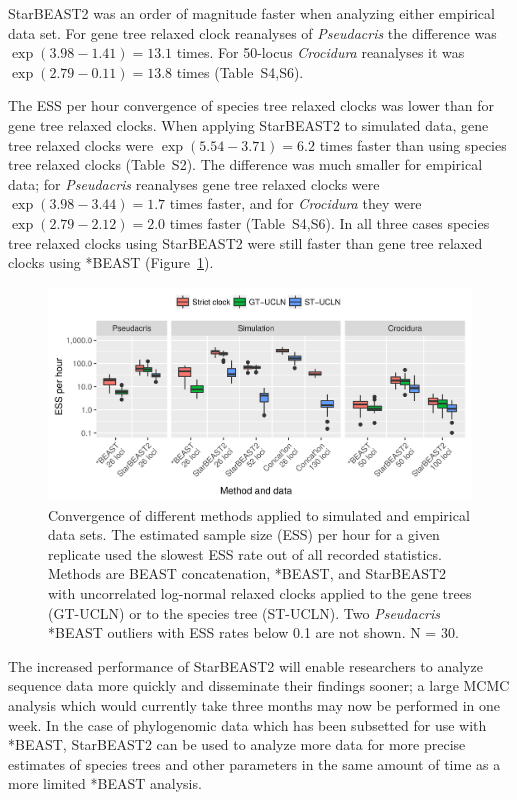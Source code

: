 \documentclass[12pt]{article}
\begin{document}
StarBEAST2 was an order of magnitude faster when analyzing either
empirical data set. For gene tree relaxed clock reanalyses of
\textit{Pseudacris} the difference was $\exp(3.98 - 1.41) = 13.1$ times. For
50-locus \textit{Crocidura} reanalyses it was $\exp(2.79 - 0.11) = 13.8$ times
(Table~S4,S6).

The ESS per hour convergence of species tree relaxed clocks was lower than for
gene tree relaxed clocks. When applying StarBEAST2 to simulated data, gene tree relaxed clocks were
$\exp(5.54 - 3.71) = 6.2$ times faster than using species tree relaxed clocks (Table~S2). The difference was much smaller for empirical data;
for \textit{Pseudacris} reanalyses gene tree relaxed clocks were $\exp(3.98 -
3.44) = 1.7$ times faster, and for \textit{Crocidura} they were $\exp(2.79 -
2.12) = 2.0$ times faster (Table~S4,S6). In all three cases species tree relaxed clocks
using StarBEAST2 were still faster than gene tree relaxed clocks using *BEAST
(Figure~\ref{fig:essPerHourComparison}).

\begin{figure}[htb!]
\centering
\includegraphics[width=\textwidth]{minimum_ess_per_hour_comparison.png}
\caption
{Convergence of different methods applied to simulated and empirical data
sets. The estimated sample size (ESS) per hour for a given replicate used the
slowest ESS rate out of all recorded statistics. Methods are BEAST
concatenation, *BEAST, and StarBEAST2 with uncorrelated log-normal relaxed
clocks applied to the gene trees (GT-UCLN) or to the species tree (ST-UCLN).
Two \textit{Pseudacris} *BEAST outliers with ESS rates below 0.1
are not shown.  N = 30.}
\label{fig:essPerHourComparison}
\end{figure}

The increased performance of StarBEAST2 will enable researchers to analyze
sequence data more quickly and disseminate their findings sooner; a large MCMC
analysis which would currently take three months may now be performed in one
week. In the case of phylogenomic data which has been subsetted for use with
*BEAST, StarBEAST2 can be used to analyze more data for more
precise estimates of species trees and other parameters in the same amount of
time as a more limited *BEAST analysis.
\end{document}

